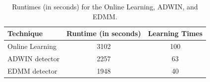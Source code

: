 \begin{table}[H]
  \centering
  \caption{Runtimes (in seconds) for the Online Learning, ADWIN, and EDMM.}
  \begin{tabular}{|l|c|c|}
  \hline
  \textbf{Technique}       & \textbf{Runtime (in seconds)} & \textbf{Learning Times} \\ \hline
  Online Learning          & 3102             & 100                     \\ \hline
  ADWIN detector           & 2257             & 63                      \\ \hline
  EDMM detector            & 1948             & 40                      \\ \hline
  \end{tabular}
  \label{table:6_table4}
  \end{table}